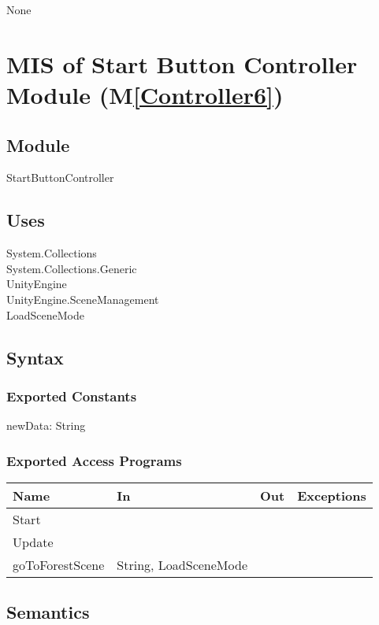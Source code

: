 \documentclass[12pt, titlepage]{article}
\newcommand{\mref}[1]{M\ref{#1}}
\begin{document}
None

\newpage

 \section{MIS of Start Button Controller Module (\mref{Controller6})}
 
\subsection{Module}
StartButtonController

\subsection{Uses}
System.Collections\\
System.Collections.Generic\\
UnityEngine\\
UnityEngine.SceneManagement\\
LoadSceneMode
\subsection{Syntax}

\subsubsection{Exported Constants}
newData: String
\subsubsection{Exported Access Programs}

\begin{center}
\begin{tabular}{|l|l|l|p{5cm}|}
\hline
\textbf{Name} & \textbf{In} & \textbf{Out} & \textbf{Exceptions} \\
\hline

Start & & & \\
\hline
Update & & & \\
\hline
goToForestScene & String, LoadSceneMode& &\\

\hline
\end{tabular}
\end{center}

\subsection{Semantics}
\end{document}
